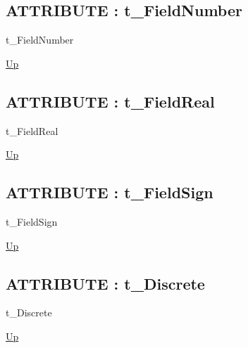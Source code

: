 \par
\par
\subsection*{ATTRIBUTE : t\_FieldNumber}
\hypertarget{ecldoc:ml_core.types.t_fieldnumber}{}
\begin{minipage}[t]{\textwidth}
\begin{flushleft}
 t\_FieldNumber 
\end{flushleft}
\end{minipage}
\hyperlink{ecldoc:ML_Core.Types}{Up}

\par
\par
\subsection*{ATTRIBUTE : t\_FieldReal}
\hypertarget{ecldoc:ml_core.types.t_fieldreal}{}
\begin{minipage}[t]{\textwidth}
\begin{flushleft}
 t\_FieldReal 
\end{flushleft}
\end{minipage}
\hyperlink{ecldoc:ML_Core.Types}{Up}

\par
\par
\subsection*{ATTRIBUTE : t\_FieldSign}
\hypertarget{ecldoc:ml_core.types.t_fieldsign}{}
\begin{minipage}[t]{\textwidth}
\begin{flushleft}
 t\_FieldSign 
\end{flushleft}
\end{minipage}
\hyperlink{ecldoc:ML_Core.Types}{Up}

\par
\par
\subsection*{ATTRIBUTE : t\_Discrete}
\hypertarget{ecldoc:ml_core.types.t_discrete}{}
\begin{minipage}[t]{\textwidth}
\begin{flushleft}
 t\_Discrete 
\end{flushleft}
\end{minipage}
\hyperlink{ecldoc:ML_Core.Types}{Up}

